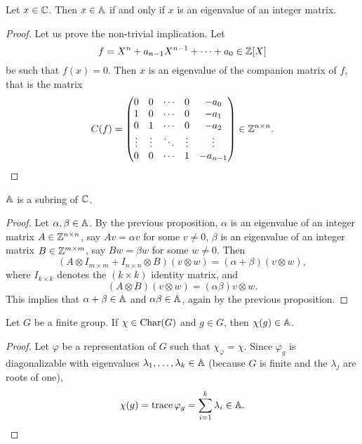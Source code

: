 \begin{proposition}
    Let $x\in\mathbb{C}$. Then $x\in\mathbb{A}$ if and only if $x$ is an eigenvalue of
    an integer matrix.
\end{proposition}

\begin{proof}
    Let us prove the non-trivial implication. Let 
    \[
    f=X^n+a_{n-1}X^{n-1}+\cdots+a_0\in\mathbb{Z}[X]
    \]
    be such that $f(x)=0$. Then $x$ is an eigenvalue
    of the companion matrix of $f$, that is the matrix
    \[
    C(f)=
    \begin{pmatrix}
    0&0&\cdots &0&-a_{0}\\
    1&0&\cdots &0&-a_{1}\\
    0&1&\cdots &0&-a_{2}\\
    \vdots &\vdots &\ddots &\vdots &\vdots \\
    0&0&\cdots &1&-a_{{n-1}}
    \end{pmatrix}
    \in\mathbb{Z}^{n\times n}.\qedhere 
    \]
\end{proof}

\begin{theorem}
\label{thm:Asubring}
    $\mathbb{A}$ is a subring of $\mathbb{C}$. 
\end{theorem}

\begin{proof}
    Let $\alpha,\beta\in\mathbb{A}$. By the previous proposition, 
    $\alpha$ is an eigenvalue 
    of an integer matrix $A\in\mathbb{Z}^{n\times n}$, say
    $Av=\alpha v$ for some $v\ne0$, 
    $\beta$ is an eigenvalue of an integer matrix 
    $B\in\mathbb{Z}^{m\times m}$, say $Bw=\beta w$ for some $w\ne0$. Then
    \[
    (A\otimes I_{m\times m}+I_{n\times n}\otimes B)(v\otimes w)
    =(\alpha+\beta)(v\otimes w), 
    \]
    where $I_{k\times k}$ denotes the $(k\times k)$ identity 
    matrix, and
    \[
    (A\otimes B)(v\otimes w)=(\alpha\beta)v\otimes w.
    \]
    This implies that 
    $\alpha+\beta\in\mathbb{A}$ and $\alpha\beta\in\mathbb{A}$, again 
    by the previous proposition. 
\end{proof}

\begin{theorem}
\label{thm:A}
    Let $G$ be a finite group. If $\chi\in\operatorname{Char}(G)$ and
    $g\in G$, then $\chi(g)\in\mathbb{A}$. 
\end{theorem}

\begin{proof}
    Let $\varphi$ be a representation of $G$ such that 
    $\chi_\varphi=\chi$. Since $\varphi_g$ is diagonalizable with
    eigenvalues $\lambda_1,\dots,\lambda_k\in\mathbb{A}$ (because
    $G$ is finite and the $\lambda_j$ are roots of one), 
    \[
    \chi(g)=\operatorname{trace}\varphi_g=\sum_{i=1}^k\lambda_i\in\mathbb{A}. \qedhere
    \]
\end{proof}

